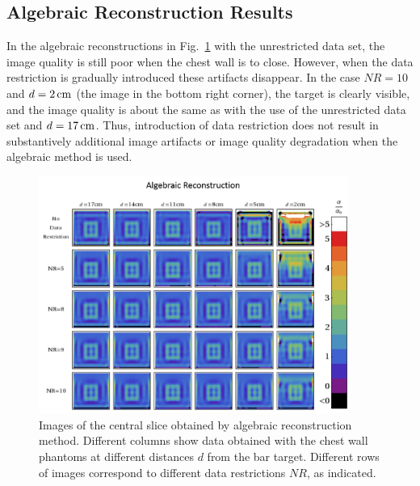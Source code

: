 \subsection{Algebraic Reconstruction Results}
In the algebraic reconstructions in Fig.~\ref{fig:algcenter} with the unrestricted data set, the image quality is still poor when the chest wall is to close. However, when the data restriction is gradually introduced these artifacts disappear. In the case $NR=10$ and $d=2\,{\rm cm}$ (the image in the bottom right corner), the target is clearly visible, and the image quality is about the same as with the use of the unrestricted data set and $d=17\,{\rm cm}$. Thus, introduction of data restriction does not result in substantively additional image artifacts or image quality degradation when the algebraic method is used.
\begin{figure}[h]
\centering
\includegraphics[width=0.9\textwidth]{./figures/3_Chestwall/algcenter.png}
\caption[Images of the central slice obtained by algebraic reconstruction method]{\label{fig:algcenter}
Images of the central slice obtained by algebraic reconstruction method. Different columns show data obtained with the chest wall phantoms at different distances $d$ from the bar target.  Different rows of images correspond to different data restrictions $NR$, as indicated.}
\end{figure}
